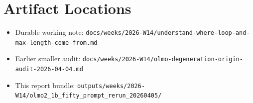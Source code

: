 \documentclass[11pt]{article}
\begin{document}
\section*{Artifact Locations}
\begin{itemize}[leftmargin=1.5em]
\item Durable working note: \texttt{docs/weeks/2026-W14/understand-where-loop-and-max-length-come-from.md}
\item Earlier smaller audit: \texttt{docs/weeks/2026-W14/olmo-degeneration-origin-audit-2026-04-04.md}
\item This report bundle: \texttt{outputs/weeks/2026-W14/olmo2\_1b\_fifty\_prompt\_rerun\_20260405/}
\end{itemize}
\end{document}
